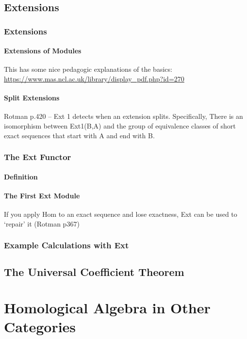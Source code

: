 \documentclass[oneside,english]{amsbook}
\numberwithin{section}{chapter}
\theoremstyle{plain}
\theoremstyle{definition}
\begin{document}
	\chapter{Extensions}
	
		\section{Extensions}
			\subsection{Extensions of Modules}
			
				This has some nice pedagogic explanations of the basics: \url{https://www.mas.ncl.ac.uk/library/display_pdf.php?id=270}
			
			\subsection{Split Extensions}
				Rotman p.420 -- Ext 1 detects when an extension splits. Specifically, There is an isomorphism between Ext1(B,A)
				and the group of equivalence classes of short exact sequences that start with A and end with B.
		
		\section{The Ext Functor}

			\subsection{Definition}
			
			\subsection{The First Ext Module}
			
				If you apply Hom to an exact sequence and lose exactness, Ext can be used to `repair' it (Rotman p367)
		\section{Example Calculations with Ext}
		

	\chapter{The Universal Coefficient Theorem}
		

	\part{Homological Algebra in Other Categories}
	
\end{document}
